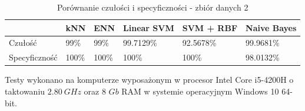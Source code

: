 \documentclass[[10pt,a4paper]{article}
\begin{document}
\begin{table}[h]
\centering
\caption{Porównanie czułości i specyficzności - zbiór danych 2}
\label{sens2}
\begin{tabular}{|l|l|l|l|l|l|}
\hline
              & kNN & ENN & Linear SVM & SVM + RBF & Naive Bayes \\ \hline
Czułość       &  99\%   &  99\%   &    99.7129\%        &     92.5678\%       &   99.9681\%          \\ \hline
Specyficzność &  100\%   &  100\%   &     100\%       &      100\%     &   98.0132\%          \\ \hline
\end{tabular}
\end{table}



Testy wykonano na komputerze wyposażonym w procesor Intel Core i5-4200H o taktowaniu $2.80 \: GHz$ oraz 8 $Gb$ RAM w systemie operacyjnym Windows 10 64-bit.
\end{document}
